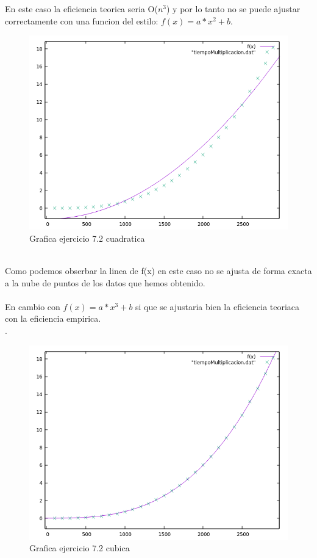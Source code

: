 \documentclass[12pt,a4psprt]{article}
\begin{document}
\pagebreak
En este caso la eficiencia teorica seria O($n^{3}$) y por lo tanto no se puede ajustar correctamente con una funcion del estilo: \textbf{$f(x)=a*x^{2}+b $}.
\begin{figure}[h]
\begin{center}
	\includegraphics[scale=1]{image/grafica_7_2_cuadratica.png}
\end{center}
\caption{Grafica ejercicio 7.2 cuadratica}
\end{figure}
\\Como podemos obserbar la linea de f(x) en este caso no se ajusta de forma exacta a la nube de puntos de los datos que hemos obtenido.\\
\pagebreak
\\En cambio con \textbf{$f(x)=a*x^{3}+b $} si que se ajustaria bien la eficiencia teoriaca con la eficiencia empirica.\\.

\begin{figure}[h]
\begin{center}
	\includegraphics[scale=1]{image/grafica_7_2_cubica.png}
\end{center}
\caption{Grafica ejercicio 7.2 cubica}

\end{figure}
\end{document}
